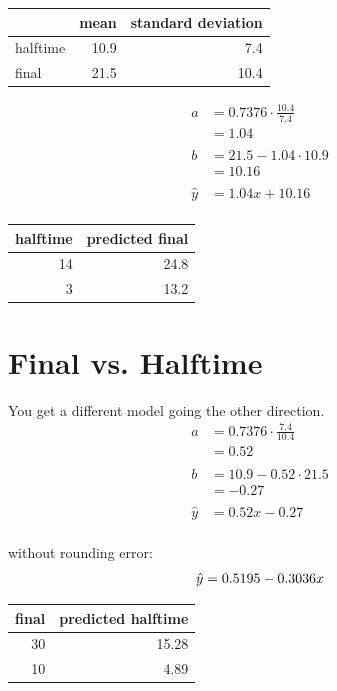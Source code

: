 \documentclass[letterpaper, landscape]{exam}
\begin{document}
  \begin{tabular}[H]{lrr}
    \toprule
             & mean & standard deviation \\
    \midrule
    halftime & 10.9 & 7.4 \\
    final    & 21.5 & 10.4 \\
    \bottomrule
  \end{tabular}

  \begin{align*}
    a & = 0.7376 \cdot \frac{10.4}{7.4} \\
      & = 1.04 \\
    \\
    b & = 21.5 - 1.04 \cdot 10.9 \\
      & = 10.16 \\
    \\
    \hat{y} &= 1.04 x + 10.16 \\
  \end{align*}

  \begin{tabular}[H]{rr}
    \toprule
    halftime & predicted final \\
    \midrule
    14       & 24.8 \\
    3        & 13.2 \\
    \bottomrule
  \end{tabular}

  \section{Final vs. Halftime}

  You get a different model going the other direction.
  \begin{align*}
    a & = 0.7376 \cdot \frac{7.4}{10.4} \\
      & = 0.52 \\
    \\
    b & = 10.9 - 0.52 \cdot 21.5 \\
      & = -0.27 \\
    \\
    \hat{y} &= 0.52 x - 0.27 \\
  \end{align*}

  without rounding error:
  \[
    \hat{y} = 0.5195 - 0.3036 x \\
  \]

  \begin{tabular}[H]{rr}
    \toprule
    final & predicted halftime \\
    \midrule
    30    & 15.28 \\
    10    & 4.89 \\
    \bottomrule
  \end{tabular}
\end{document}
